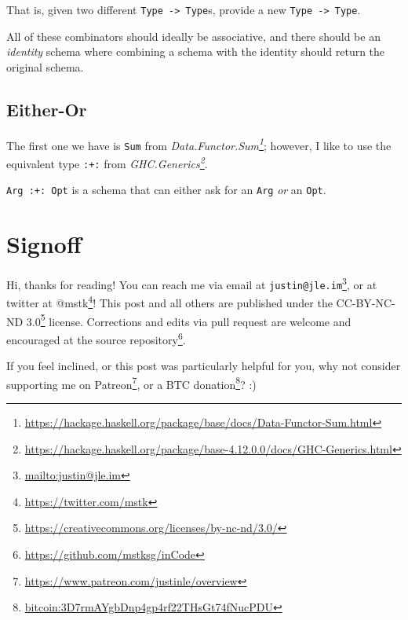 \documentclass[]{article}
\renewcommand{\href}[2]{#2\footnote{\url{#1}}}
\begin{document}
That is, given two different \texttt{Type\ -\textgreater{}\ Type}s, provide a
new \texttt{Type\ -\textgreater{}\ Type}.

All of these combinators should ideally be associative, and there should be an
\emph{identity} schema where combining a schema with the identity should return
the original schema.

\hypertarget{either-or}{%
\subsection{Either-Or}\label{either-or}}

The first one we have is \texttt{Sum} from
\emph{\href{https://hackage.haskell.org/package/base/docs/Data-Functor-Sum.html}{Data.Functor.Sum}};
however, I like to use the equivalent type \texttt{:+:} from
\emph{\href{https://hackage.haskell.org/package/base-4.12.0.0/docs/GHC-Generics.html}{GHC.Generics}}.

\texttt{Arg\ :+:\ Opt} is a schema that can either ask for an \texttt{Arg}
\emph{or} an \texttt{Opt}.

\hypertarget{signoff}{%
\section{Signoff}\label{signoff}}

Hi, thanks for reading! You can reach me via email at
\href{mailto:justin@jle.im}{\nolinkurl{justin@jle.im}}, or at twitter at
\href{https://twitter.com/mstk}{@mstk}! This post and all others are published
under the \href{https://creativecommons.org/licenses/by-nc-nd/3.0/}{CC-BY-NC-ND
3.0} license. Corrections and edits via pull request are welcome and encouraged
at \href{https://github.com/mstksg/inCode}{the source repository}.

If you feel inclined, or this post was particularly helpful for you, why not
consider \href{https://www.patreon.com/justinle/overview}{supporting me on
Patreon}, or a \href{bitcoin:3D7rmAYgbDnp4gp4rf22THsGt74fNucPDU}{BTC donation}?
:)
\end{document}

